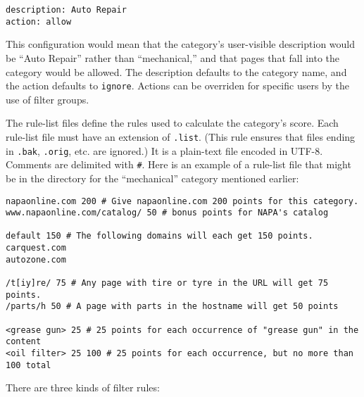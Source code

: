 \documentclass{article}
\begin{document}
\begin{verbatim}
description: Auto Repair
action: allow
\end{verbatim}

This configuration would mean that the category's user-visible description would be 
``Auto Repair'' rather than ``mechanical,'' and that pages that fall into the category would be allowed. 
The description defaults to the category name, and the action 
defaults to \verb"ignore". Actions can be overriden for specific users by the use of filter groups.

The rule-list files define the rules used to calculate the category's score. 
Each rule-list file must have an extension of \verb".list". 
(This rule ensures that files ending in \verb".bak", \verb".orig", etc. are ignored.) 
It is a plain-text file encoded in UTF-8. Comments are delimited with \verb"#". 
Here is an example of a rule-list file that might be in the directory for the 
``mechanical'' category mentioned earlier:

\begin{verbatim}
napaonline.com 200 # Give napaonline.com 200 points for this category.
www.napaonline.com/catalog/ 50 # bonus points for NAPA's catalog

default 150 # The following domains will each get 150 points.
carquest.com
autozone.com

/t[iy]re/ 75 # Any page with tire or tyre in the URL will get 75 points.
/parts/h 50 # A page with parts in the hostname will get 50 points

<grease gun> 25 # 25 points for each occurrence of "grease gun" in the content
<oil filter> 25 100 # 25 points for each occurrence, but no more than 100 total
\end{verbatim}

There are three kinds of filter rules:
\end{document}
